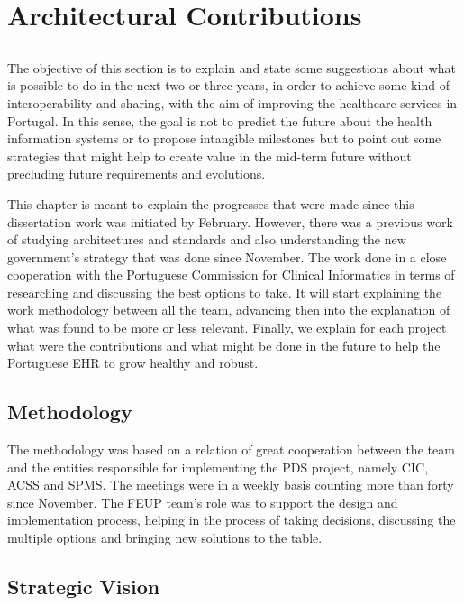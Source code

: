 \chapter{Architectural Contributions} \label{chap:arch-proposal}

\section*{}

The objective of this section is to explain and state some suggestions about what is possible to do in the next two or three years, in order to achieve some kind of interoperability and sharing, with the aim of improving the healthcare services in Portugal. In this sense, the goal is not to predict the future about the health information systems or to propose intangible milestones but to point out some strategies that might help to create value in the mid-term future without precluding future requirements and evolutions.

This chapter is meant to explain the progresses that were made since this dissertation work was initiated by February. However, there was a previous work of studying architectures and standards and also understanding the new government's strategy that was done since November. The work done in a close cooperation with the Portuguese Commission for Clinical Informatics in terms of researching and discussing the best options to take. It will start explaining the work methodology between all the team, advancing then into the explanation of what was found to be more or less relevant. Finally, we explain for each project what were the contributions and what might be done in the future to help the Portuguese EHR to grow healthy and robust.

\section{Methodology}

The methodology was based on a relation of great cooperation between the team and the entities responsible for implementing the PDS project, namely CIC, ACSS and SPMS. The meetings were in a weekly basis counting more than forty since November. The FEUP team's role was to support the design and implementation process, helping in the process of taking decisions, discussing the multiple options and bringing new solutions to the table.

\section{Strategic Vision}

